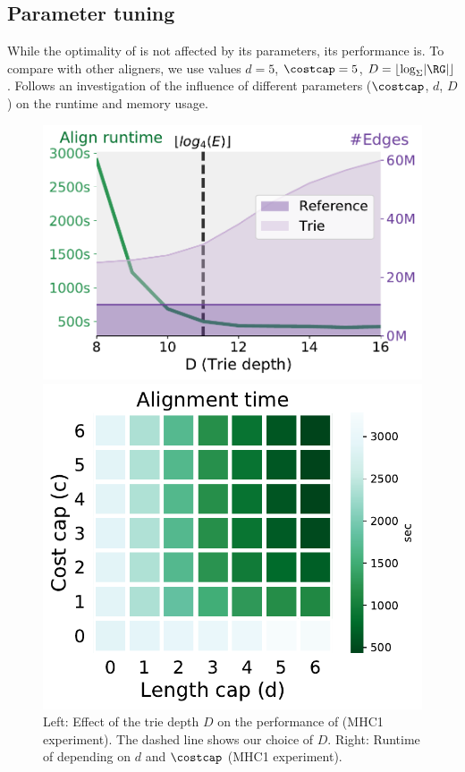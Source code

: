 \subsection{Parameter tuning} \label{TRIEsubsec:parameter_estimation}

While the optimality of \astarix is not affected by its parameters, its
performance is. To compare with other aligners, we use values \mbox{$d=5$},
\mbox{$\costcap=5$}, \mbox{$D = \lfloor \log_\Sigma \lvert \RG \rvert \rfloor$}.
Follows an investigation of the influence of different parameters ($\costcap$,
$d$, $D$) on the runtime and memory usage.

\begin{figure}[t]
	\centering
	\begin{minipage}{0.45\linewidth}
		\centering
		\includegraphics[width=\linewidth]{figs/trie/MHC1-trie-vs-D.pdf}
		\caption[Performance for various trie depths and heuristic parameters]{Left: Effect of the trie depth $D$ on the performance of \astarix (MHC1 experiment). The dashed line shows our choice of $D$. Right: Runtime of \astarix depending on $d$ and $\costcap$ (MHC1 experiment).}
		\label{TRIEfig:trie_vs_D}
	\end{minipage}%
	\begin{minipage}{0.45\linewidth}
		\centering
		\includegraphics[width=0.8\linewidth]{figs/heuristic/MHC1-heatmap-c_vs_d-align_sec.pdf}

\end{minipage}
\end{figure}
